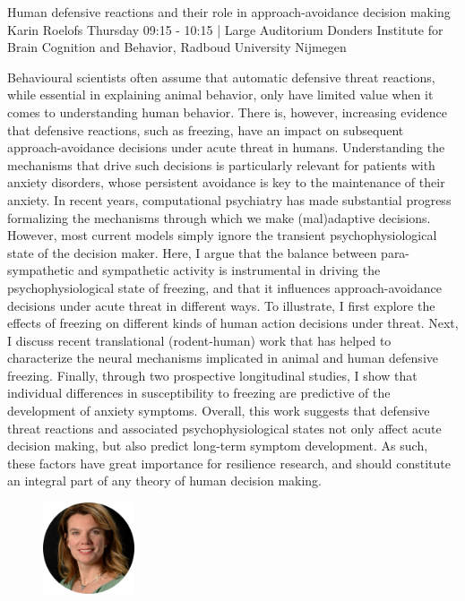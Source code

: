 
\begin{keynote}
    {Human defensive reactions and their role in approach-avoidance decision making}
    {Karin Roelofs}
    {Thursday 09:15 - 10:15 | Large Auditorium}
    {Donders Institute for Brain Cognition and Behavior, Radboud University Nijmegen}

    Behavioural scientists often assume that automatic defensive threat reactions, while essential in explaining animal behavior, only have limited value when it comes to understanding human behavior. There is, however, increasing evidence that defensive reactions, such as freezing, have an impact on subsequent approach-avoidance decisions under acute threat in humans. Understanding the mechanisms that drive such decisions is particularly relevant for patients with anxiety disorders, whose persistent avoidance is key to the maintenance of their anxiety. In recent years, computational psychiatry has made substantial progress formalizing the mechanisms through which we make (mal)adaptive decisions. However, most current models simply ignore the transient psychophysiological state of the decision maker. Here, I argue that the balance between para-sympathetic and sympathetic activity is instrumental in driving the psychophysiological state of freezing, and that it influences approach-avoidance decisions under acute threat in different ways. To illustrate, I first explore the effects of freezing on different kinds of human action decisions under threat. Next, I discuss recent translational (rodent-human) work that has helped to characterize the neural mechanisms implicated in animal and human defensive freezing. Finally, through two prospective longitudinal studies, I show that individual differences in susceptibility to freezing are predictive of the development of anxiety symptoms. 
    Overall, this work suggests that defensive threat reactions and associated psychophysiological states not only affect acute decision making, but also predict long-term symptom development. As such, these factors have great importance for resilience research, and should constitute an integral part of any theory of human decision making.


    \begin{figure}[H]
        \raggedleft
        \includegraphics[width=0.24\textwidth]{tex/images/keynote_speaker/roeloefs_cropped.png}
    \end{figure}

\end{keynote}
